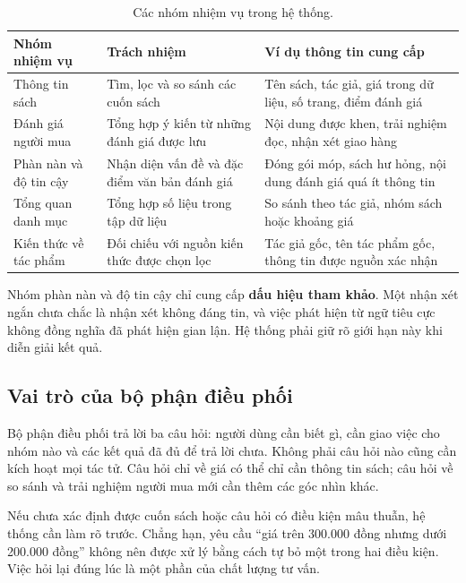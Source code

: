 \begin{table}[htbp]\small
\caption{Các nhóm nhiệm vụ trong hệ thống.}
\begin{tabularx}{\linewidth}{P{33mm}YY}\toprule
Nhóm nhiệm vụ & Trách nhiệm & Ví dụ thông tin cung cấp\\\midrule
Thông tin sách & Tìm, lọc và so sánh các cuốn sách & Tên sách, tác giả, giá trong dữ liệu, số trang, điểm đánh giá\\
Đánh giá người mua & Tổng hợp ý kiến từ những đánh giá được lưu & Nội dung được khen, trải nghiệm đọc, nhận xét giao hàng\\
Phàn nàn và độ tin cậy & Nhận diện vấn đề và đặc điểm văn bản đánh giá & Đóng gói móp, sách hư hỏng, nội dung đánh giá quá ít thông tin\\
Tổng quan danh mục & Tổng hợp số liệu trong tập dữ liệu & So sánh theo tác giả, nhóm sách hoặc khoảng giá\\
Kiến thức về tác phẩm & Đối chiếu với nguồn kiến thức được chọn lọc & Tác giả gốc, tên tác phẩm gốc, thông tin được nguồn xác nhận\\\bottomrule
\end{tabularx}
\end{table}

Nhóm phàn nàn và độ tin cậy chỉ cung cấp \textbf{dấu hiệu tham khảo}. Một nhận xét ngắn chưa chắc là nhận xét không đáng tin, và việc phát hiện từ ngữ tiêu cực không đồng nghĩa đã phát hiện gian lận. Hệ thống phải giữ rõ giới hạn này khi diễn giải kết quả.

\subsection{Vai trò của bộ phận điều phối}
Bộ phận điều phối trả lời ba câu hỏi: người dùng cần biết gì, cần giao việc cho nhóm nào và các kết quả đã đủ để trả lời chưa. Không phải câu hỏi nào cũng cần kích hoạt mọi tác tử. Câu hỏi chỉ về giá có thể chỉ cần thông tin sách; câu hỏi về so sánh và trải nghiệm người mua mới cần thêm các góc nhìn khác.

Nếu chưa xác định được cuốn sách hoặc câu hỏi có điều kiện mâu thuẫn, hệ thống cần làm rõ trước. Chẳng hạn, yêu cầu ``giá trên 300.000 đồng nhưng dưới 200.000 đồng'' không nên được xử lý bằng cách tự bỏ một trong hai điều kiện. Việc hỏi lại đúng lúc là một phần của chất lượng tư vấn.


